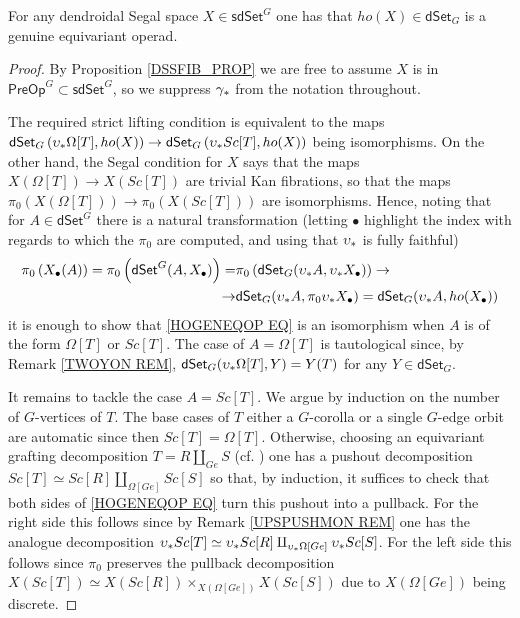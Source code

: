 \documentclass[a4paper,10pt
 ,draft
]{article}%
\begin{document}
\begin{proposition}
      \label{HMTPYGEN PROP}
For any dendroidal Segal space $X \in \mathsf{sdSet}^G$ one has that 
$ho(X) \in \mathsf{dSet}_G$ is a genuine equivariant operad. %
\end{proposition}

\begin{proof}
By Proposition \ref{DSSFIB_PROP} we are free to assume 
$X$ is in $\mathsf{PreOp}^G \subset \mathsf{sdSet}^G$, so we suppress $\gamma_{\**}$ from the notation throughout.

The required strict lifting condition is equivalent to the 
 maps
$\mathsf{dSet}_G\left(\upsilon_{\**}\Omega[T], ho(X)\right)
\to
\mathsf{dSet}_G\left(\upsilon_{\**}Sc[T], ho(X)\right)$
being isomorphisms.
On the other hand, the Segal condition for $X$ says that the maps 
$X(\Omega[T]) \to X(Sc[T])$
are trivial Kan fibrations, so that the maps 
$\pi_0\left(X(\Omega[T])\right) \to \pi_0\left(X(Sc[T])\right)$
are isomorphisms. 
Hence, noting that
for $A \in \mathsf{dSet}^G$
there is a natural transformation
(letting $\bullet$ highlight the index with regards to which the $\pi_0$ are computed, and using that $\upsilon_{\**}$ is fully faithful)
\begin{equation}\label{HOGENEQOP EQ}
\begin{split}
	\pi_0\left( X_{\bullet}(A) \right)=
	\pi_0 \left(
	\mathsf{dSet}^G(A,X_{\bullet})
	\right)
= &
	\pi_0 \left(
	\mathsf{dSet}_G(\upsilon_{\**} A,\upsilon_{\**} X_{\bullet})
	\right)
\to 
\\
\to &
	\mathsf{dSet}_G(\upsilon_{\**} A,\pi_0 \upsilon_{\**} X_{\bullet})
=
	\mathsf{dSet}_G(\upsilon_{\**} A,ho(X_{\bullet}))
\end{split}
\end{equation}
it is enough to show that \eqref{HOGENEQOP EQ}
is an isomorphism when $A$ is of the form $\Omega[T]$ or $Sc[T]$.
The case of $A=\Omega[T]$
is tautological since, by Remark \ref{TWOYON REM},
$\mathsf{dSet}_G(\upsilon_{\**}\Omega[T],Y) = Y(T)$
for any $Y \in \mathsf{dSet}_G$. 

It remains to tackle the case $A=Sc[T]$.
We argue by induction on the number of $G$-vertices of $T$.
The base cases of $T$ either a $G$-corolla or a single $G$-edge orbit are automatic since then $Sc[T] = \Omega[T]$.
Otherwise, choosing an equivariant grafting decomposition
$T = R \amalg_{Ge} S$ (cf. \cite[(5.18) and Prop. 6.19]{Per18})
one has a pushout decomposition
$Sc[T] \simeq Sc[R] \amalg_{\Omega[Ge]} Sc[S]$
so that, by induction, it suffices to check that both sides of 
\eqref{HOGENEQOP EQ} turn this pushout into a pullback.
For the right side this follows since by 
Remark \ref{UPSPUSHMON REM}
one has the analogue decomposition
$\upsilon_{\**} Sc[T] \simeq \upsilon_{\**} Sc[R] \amalg_{\upsilon_{\**}\Omega[Ge]} \upsilon_{\**} Sc[S]$.
For the left side this follows since $\pi_0$
preserves the pullback decomposition
$X(Sc[T]) \simeq X(Sc[R]) \times_{X(\Omega[Ge])} X(Sc[S])$ due to
$X(\Omega[Ge])$ being discrete.
\end{proof}
\end{document}
